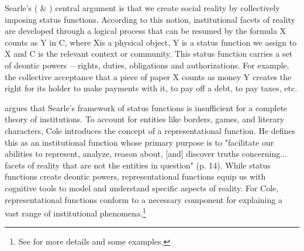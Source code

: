 \documentclass[11pt,a4paper]{article}
\begin{document}
Searle's (\citeyear{searle1995} \& \citeyear{searle2010}) central argument is that we create social reality by collectively imposing status functions. According to this notion, institutional facets of reality are developed through a logical process that can be resumed by the formula $\mathrm{X}$ counts as $\mathrm{Y}$ in C, where $\mathrm{X}$is a physical object, $\mathrm{Y}$ is a status function we assign to $\mathrm{X}$ and $\mathrm{C}$ is the relevant context or community. This status function carries a set of deontic powers —rights, duties, obligations and authorizations. For example, the collective acceptance that a piece of paper $\mathrm{X}$ counts as money $\mathrm{Y}$ creates the right for its holder to make payments with it, to pay off a debt, to pay taxes, etc.  

\textcite{Cole2013} argues that Searle's framework of status functions is insufficient for a complete theory of institutions. To account for entities like borders, games, and literary characters, Cole introduces the concept of a representational function. He defines this as an institutional function whose primary purpose is to "facilitate our abilities to represent, analyze, reason about, [and] discover truths concerning... facets of reality that are not the entities in question" (p. 14). While status functions create deontic powers, representational functions equip us with cognitive tools to model and understand specific aspects of reality. For Cole, representational functions conform to a necessary component for explaining a vast range of institutional phenomena.\footnote{See \textcite[14--22]{Cole2013} for more details and some examples.}
\end{document}
